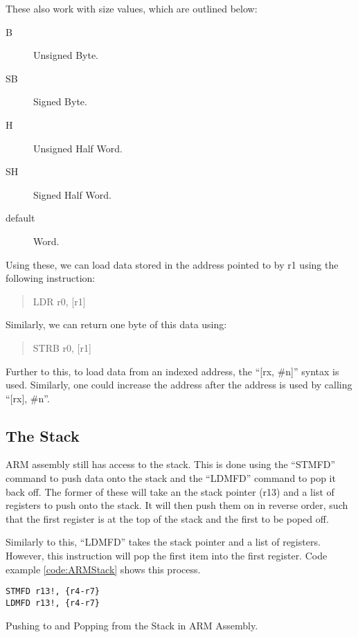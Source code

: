 				These also work with size values, which are outlined below:
				\begin{description}
					\item[B] Unsigned Byte. 
					\item[SB] Signed Byte. 
					\item[H] Unsigned Half Word.
					\item[SH] Signed Half Word.
					\item[default] Word. 
				\end{description}
				Using these, we can load data stored in the address pointed to by r1 using the following instruction:
				\begin{quote}
					LDR r0, [r1]
				\end{quote}
				Similarly, we can return one byte of this data using:
				\begin{quote}
					STRB r0, [r1]
				\end{quote}

				Further to this, to load data from an indexed address, the ``[rx, \#n]'' syntax is used. 
				Similarly, one could increase the address after the address is used by calling ``[rx], \#n''. 

			\subsection{The Stack}
				ARM assembly still has access to the stack. 
				This is done using the ``STMFD'' command to push data onto the stack and the ``LDMFD'' command to pop it back off. 
				The former of these will take an the stack pointer (r13) and a list of registers to push onto the stack. 
				It will then push them on in reverse order, such that the first register is at the top of the stack and the first to be poped off. 

				Similarly to this, ``LDMFD'' takes the stack pointer and a list of registers. 
				However, this instruction will pop the first item into the first register. 
				Code example \ref{code:ARMStack} shows this process. 

				\begin{code}
					\begin{lstlisting}[language={[Motorola68k]Assembler}]
STMFD r13!, {r4-r7}
LDMFD r13!, {r4-r7}
					\end{lstlisting}
					\caption{Pushing to and Popping from the Stack in ARM Assembly.}
					\label{code:ARMStack}
				\end{code}

